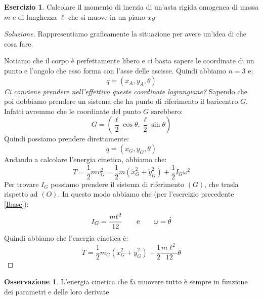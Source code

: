 \documentclass[11pt,a4paper,twoside]{article}
\theoremstyle{definition}
\newtheorem*{oss}{Osservazione}
\newtheorem{ese}{Esercizio}[section]
\newenvironment{sol}
	{\renewcommand\qedsymbol{$\blacksquare$}\begin{proof}[Soluzione]}
	{\end{proof}}
\begin{document}
\begin{ese}\label{121}
	Calcolare il momento di inerzia di un'asta rigida omogenea di massa $m$ e di lunghezza $\ell$ che si muove in un piano $xy$
\end{ese}
\begin{sol}
	Rappresentiamo graficamente la situazione per avere un'idea di che cosa fare.
	\begin{center}
	\end{center}
	Notiamo che il corpo è perfettamente libero e ci basta sapere le coordinate di un punto e l'angolo che esso forma con l'asse delle ascisse. Quindi abbiamo $n=3$ e:
	\[ q = (x_A,y_A,\theta) \]
	\textit{Ci conviene prendere nell'effettivo queste coordinate lagrangiane?} Sapendo che poi dobbiamo prendere un sistema che ha punto di riferimento il baricentro $G$. Infatti avremmo che le coordinate del punto $G$ sarebbero:
	\[ G = \left(\frac \ell 2 \cos \theta, \frac \ell 2\sin\theta\right) \]
	Quindi possiamo prendere direttamente:
	\[q = (x_G, y_G, \theta)\]
	Andando a calcolare l'energia cinetica, abbiamo che:
	\[ T = \frac 12 mv_G^2 = \frac 12 m(\dot x_G^2 + \dot y_G^2) + \frac 12 I_G\omega^2 \]
	Per trovare $I_G$ possiamo prendere il sistema di riferimento $(G)$, che trasla rispetto ad $(O)$. In questo modo abbiamo che (per l'esercizio precedente \ref{Ibase}):
	\[ I_G = \frac{m\ell^2}{12} \qquad \text e \qquad \omega =\dot \theta \]
	Quindi abbiamo che l'energia cinetica è:
	\[ T = \frac 12 m_G(\dot x_G^2 + \dot y_G^2) + \frac 12 \frac{m\ell^2}{12}\dot \theta \]
\end{sol}

\begin{oss}
	L'energia cinetica che fa muovere tutto è sempre in funzione dei parametri e delle loro derivate
\end{oss}
\end{document}
